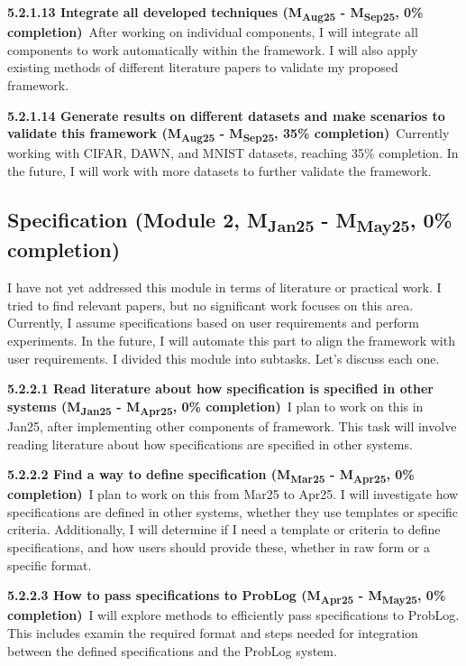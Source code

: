\noindent \textbf{5.2.1.13 Integrate all developed techniques (M\textsubscript{Aug25} - M\textsubscript{Sep25}, 0\% completion)}\ After working on individual components, I will integrate all components to work automatically within the framework. I will also apply existing methods of different literature papers to validate my proposed framework.


\noindent \textbf{5.2.1.14 Generate results on different datasets and make scenarios to validate this framework (M\textsubscript{Aug25} - M\textsubscript{Sep25}, 35\% completion)}\ Currently working with CIFAR, DAWN, and MNIST datasets, reaching 35\% completion. In the future, I will work with more datasets to further validate the framework.


\subsection{Specification (Module 2, M\textsubscript{Jan25} - M\textsubscript{May25}, 0\% completion)} I have not yet addressed this module in terms of literature or practical work. I tried to find relevant papers, but no significant work focuses on this area. Currently, I assume specifications based on user requirements and perform experiments. In the future, I will automate this part to align the framework with user requirements. I divided this module into subtasks. Let's discuss each one.


\noindent \textbf{5.2.2.1 Read literature about how specification is specified in other systems (M\textsubscript{Jan25} - M\textsubscript{Apr25}, 0\% completion)}\ I plan to work on this in Jan25, after implementing other components of framework. This task will involve reading literature about how specifications are specified in other systems.

\noindent \textbf{5.2.2.2 Find a way to define specification (M\textsubscript{Mar25} - M\textsubscript{Apr25}, 0\% completion)}\ I plan to work on this from Mar25 to Apr25. I will investigate how specifications are defined in other systems, whether they use templates or specific criteria. Additionally, I will determine if I need a template or criteria to define specifications, and how users should provide these, whether in raw form or a specific format.

\noindent \textbf{5.2.2.3 How to pass specifications to ProbLog (M\textsubscript{Apr25} - M\textsubscript{May25}, 0\% completion)}\ I will explore methods to efficiently pass specifications to ProbLog. This includes examin the required format and steps needed for integration between the defined specifications and the ProbLog system.

